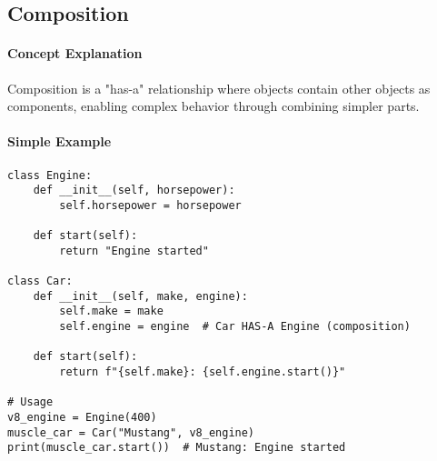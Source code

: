 \subsection{Composition}

\paragraph{Concept Explanation}
Composition is a "has-a" relationship where objects contain other objects as components, enabling complex behavior through combining simpler parts.

\paragraph{Simple Example}
\begin{lstlisting}[caption=Basic Composition Example]
class Engine:
    def __init__(self, horsepower):
        self.horsepower = horsepower
    
    def start(self):
        return "Engine started"

class Car:
    def __init__(self, make, engine):
        self.make = make
        self.engine = engine  # Car HAS-A Engine (composition)
    
    def start(self):
        return f"{self.make}: {self.engine.start()}"

# Usage
v8_engine = Engine(400)
muscle_car = Car("Mustang", v8_engine)
print(muscle_car.start())  # Mustang: Engine started
\end{lstlisting}

